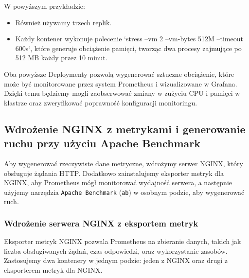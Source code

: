 \documentclass{article}
\begin{document}
W powyższym przykładzie:
\begin{itemize}
  \item Również używamy trzech replik.
  \item Każdy kontener wykonuje polecenie `stress --vm 2 --vm-bytes 512M --timeout 600s`, które generuje obciążenie pamięci, tworząc dwa procesy zajmujące po 512 MB każdy przez 10 minut.
\end{itemize}

Oba powyższe Deploymenty pozwolą wygenerować sztuczne obciążenie, które może być monitorowane przez system Prometheus i wizualizowane w Grafana. Dzięki temu będziemy mogli zaobserwować zmiany w zużyciu CPU i pamięci w klastrze oraz zweryfikować poprawność konfiguracji monitoringu.
\subsection{Wdrożenie NGINX z metrykami i generowanie ruchu przy użyciu Apache Benchmark}

Aby wygenerować rzeczywiste dane metryczne, wdrożymy serwer NGINX, który obsługuje żądania HTTP. Dodatkowo zainstalujemy eksporter metryk dla NGINX, aby Prometheus mógł monitorować wydajność serwera, a następnie użyjemy narzędzia \texttt{Apache Benchmark} (\texttt{ab}) w osobnym podzie, aby wygenerować ruch.

\subsubsection{Wdrożenie serwera NGINX z eksportem metryk}

Eksporter metryk NGINX pozwala Prometheus na zbieranie danych, takich jak liczba obsługiwanych żądań, czas odpowiedzi, oraz wykorzystanie zasobów. Zastosujemy dwa kontenery w jednym podzie: jeden z NGINX oraz drugi z eksporterem metryk dla NGINX.
\end{document}
